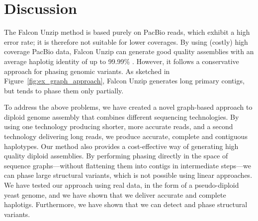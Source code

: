 

\section{Discussion}
The Falcon Unzip method \citep{chin2016phased} is based purely on PacBio reads, which exhibit a high error rate; it is therefore not suitable for lower coverages.
By using (costly) high coverage PacBio data, Falcon Unzip can generate good quality assemblies with an average haplotig identity of up to 99.99\% \citep{chin2016phased}.
However, it follows a conservative approach for phasing genomic variants.
As sketched in Figure~\ref{fig:ex_graph_approach}, Falcon Unzip generates long primary contigs, but tends to phase them only partially.

To address the above problems, we have created a novel graph-based approach to diploid genome assembly that combines different sequencing technologies.
By using one technology producing shorter, more accurate reads, and a second technology delivering long reads, we produce accurate, complete and contiguous haplotypes. 
Our method also provides a cost-effective way of generating high quality diploid assemblies.
By performing phasing directly in the space of sequence graphs---without flattening them into contigs in intermediate steps---we can phase large structural variants, which is not possible using linear approaches. 
We have tested our approach using real data, in the form of a pseudo-diploid yeast genome, and we have shown that we deliver accurate and complete haplotigs.
Furthermore, we have shown that we can detect and phase structural variants.

